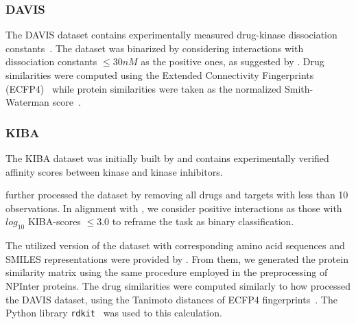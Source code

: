 \subsubsection{DAVIS}
The DAVIS dataset contains experimentally measured drug-kinase dissociation constants~\cite{davis2011}. The dataset was binarized by considering interactions with dissociation constants $\le 30 nM$ as the positive ones, as suggested by \cite{pahikkala2015}. Drug similarities were computed using the Extended Connectivity Fingerprints (ECFP4)~\cite{rogers2005, pahikkala2015} while protein similarities were taken as the normalized Smith-Waterman score~\cite{yamanishi2008,pahikkala2015}.

\subsubsection{KIBA}

The KIBA dataset was initially built by \citeauthor{tang2014} and contains experimentally verified affinity scores between kinase and kinase inhibitors.

\cite{he2017simboost} further processed the dataset by removing all drugs and targets with less than 10 observations. In alignment with \cite{tang2014,he2017simboost}, we consider positive interactions as those with $log_10$ KIBA-scores $\leq 3.0$ to reframe the task as binary classification.

The utilized version of the dataset with corresponding amino acid sequences and SMILES representations were provided by \cite{huang2020deeppurpose}. From them, we generated the protein similarity matrix using the same procedure employed in the preprocessing of NPInter proteins. The drug similarities were computed similarly to how \cite{pahikkala2015} processed the DAVIS dataset, using the Tanimoto distances of ECFP4 fingerprints~\cite{rogers2005, pahikkala2015}. The Python library \texttt{rdkit}~\cite{rdkit} was used to this calculation.


